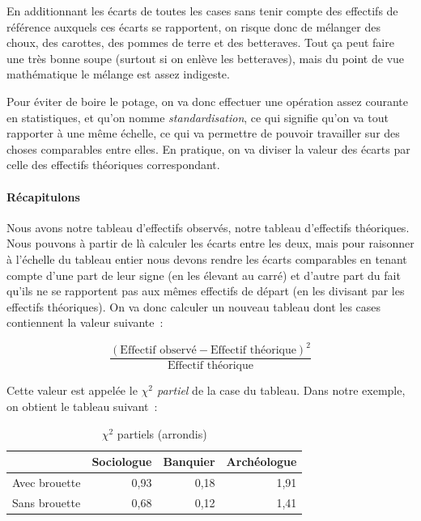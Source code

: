 \documentclass[a4paper,10pt,twoside,francais]{report}
\newcommand{\chid}{$\chi^2$\xspace}
\begin{document}
En additionnant les écarts de toutes les cases sans tenir compte des
effectifs de référence auxquels ces écarts se rapportent, on risque
donc de mélanger des choux, des carottes, des pommes de terre et des
betteraves. Tout ça peut faire une très bonne soupe (surtout si on
enlève les betteraves), mais du point de vue mathématique le mélange
est assez indigeste.

Pour éviter de boire le potage, on va donc effectuer une opération
assez courante en statistiques, et qu'on nomme
\textit{standardisation}, ce qui signifie qu'on va tout rapporter à
une même échelle, ce qui va permettre de pouvoir travailler sur des
choses comparables entre elles. En pratique, on va diviser la valeur
des écarts par celle des effectifs théoriques correspondant.

\paragraph{Récapitulons} Nous avons notre tableau d'effectifs
observés, notre tableau d'effectifs théoriques. Nous pouvons à partir
de là calculer les écarts entre les deux, mais pour raisonner à
l'échelle du tableau entier nous devons rendre les écarts comparables
en tenant compte d'une part de leur signe (en les élevant au carré) et
d'autre part du fait qu'ils ne se rapportent pas aux mêmes effectifs
de départ (en les divisant par les effectifs théoriques). On va donc
calculer un nouveau tableau dont les cases contiennent la valeur
suivante~:

$$\frac{ ( \text{Effectif observé} - \text{Effectif théorique} )^2}{\text{Effectif théorique}}$$

Cette valeur est appelée le \textit{\chid partiel} de la case du
tableau. Dans notre exemple, on obtient le tableau suivant~:

\begin{table}[H]
  \begin{center}
    \begin{tabular}{lrrr}
      \toprule
      & Sociologue & Banquier & Archéologue\\
      \midrule
      Avec brouette &  0,93 & 0,18 & 1,91\\
      Sans brouette &  0,68 & 0,12 & 1,41\\
      \bottomrule
    \end{tabular}
    \caption{\chid partiels (arrondis)}
    \label{chidpart}
  \end{center}
\end{table}
\end{document}
